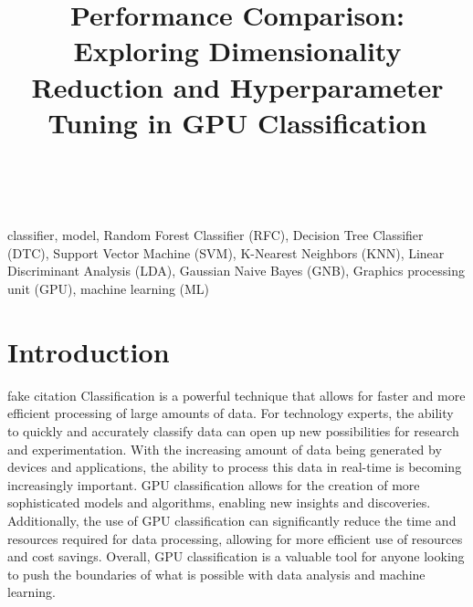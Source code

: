 \documentclass[conference,onecolumn]{IEEEtran}
\begin{document}
\title{Performance Comparison: Exploring Dimensionality Reduction and Hyperparameter Tuning in GPU Classification}

\author{\\

}

\maketitle

\begin{abstract}

\end{abstract}

\begin{IEEEkeywords}
classifier, model, Random Forest Classifier (RFC), Decision Tree Classifier (DTC), Support Vector Machine (SVM), K-Nearest Neighbors (KNN), Linear Discriminant Analysis (LDA), Gaussian Naive Bayes (GNB), Graphics processing unit (GPU), machine learning (ML)
\end{IEEEkeywords}

\newpage
\tableofcontents

\newpage
\section{Introduction}
fake citation \cite{C0}
Classification is a powerful technique that allows for faster and more efficient processing of large amounts of data. For technology experts, the ability to quickly and accurately classify data can open up new possibilities for research and experimentation. With the increasing amount of data being generated by devices and applications, the ability to process this data in real-time is becoming increasingly important. GPU classification allows for the creation of more sophisticated models and algorithms, enabling new insights and discoveries. Additionally, the use of GPU classification can significantly reduce the time and resources required for data processing, allowing for more efficient use of resources and cost savings. Overall, GPU classification is a valuable tool for anyone looking to push the boundaries of what is possible with data analysis and machine learning.
\end{document}
